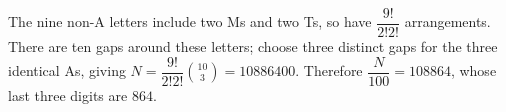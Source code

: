 The nine non-A letters include two Ms and two Ts, so have $\dfrac{9!}{2!2!}$ arrangements. There are ten gaps around these letters; choose three distinct gaps for the three identical As, giving $N=\dfrac{9!}{2!2!}\binom{10}{3}=10886400$. Therefore $\dfrac{N}{100}=108864$, whose last three digits are $\boxed{864}$.
